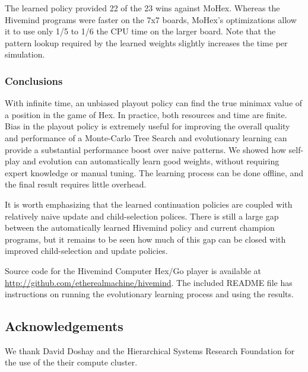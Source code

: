 \documentclass{acm_proc_article-sp}
\begin{document}
The learned policy provided 22 of the 23 wins against MoHex.
Whereas the Hivemind programs were faster on the 7x7 boards, MoHex's optimizations allow it to use only 1/5 to 1/6 the CPU time on the larger board. Note that the pattern lookup required by the learned weights slightly increases the time per simulation.

\subsubsection* {Conclusions}
With infinite time, an unbiased playout policy can find the true minimax value of a position in the game of Hex. 
In practice, both resources and time are finite. 
Bias in the playout policy is extremely useful for improving the overall quality and performance of a Monte-Carlo Tree Search and evolutionary learning can provide a substantial performance boost over naive patterns. 
We showed how self-play and evolution can automatically learn good weights, without requiring expert knowledge or manual tuning. The learning process can be done offline, and the final result requires little overhead.

It is worth emphasizing that  the learned continuation policies are coupled with relatively naive update and child-selection polices.  
There is still a large gap between the automatically learned Hivemind policy and current champion programs,
but it remains to be seen how much of this gap can be closed with improved child-selection and update policies.

Source code for the Hivemind Computer Hex/Go player is available at \url{http://github.com/etherealmachine/hivemind}. The included README file has instructions on running the evolutionary learning process and using the results.

\subsection*{Acknowledgements}
We thank David Doshay and the Hierarchical Systems Research Foundation for the use of the their compute cluster. \\



\end{document}
